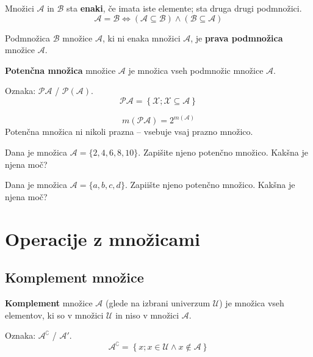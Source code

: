    
            Množici $\mathcal{A}$ in $\mathcal{B}$ sta \textbf{enaki}, če imata iste elemente; 
            sta druga drugi podmnožici.
            $$\mathcal{A}=\mathcal{B}\Leftrightarrow(\mathcal{A}\subseteq\mathcal{B})\land(\mathcal{B}\subseteq\mathcal{A})$$

            Podmnožica $\mathcal{B}$ množice $\mathcal{A}$, ki ni enaka množici $\mathcal{A}$, 
            je \textbf{prava podmnožica} množice $\mathcal{A}$.
            \newline

            \textbf{Potenčna množica} množice $\mathcal{A}$ je množica vseh podmnožic množice $\mathcal{A}$.
            
            Oznaka: $\mathbf{\mathcal{P}\mathcal{A}}$ / $\mathbf{\mathcal{P}(\mathcal{A})}$.
            $$ \mathcal{PA}=\left\{\mathcal{X}; \mathcal{X}\subseteq\mathcal{A} \right\}$$
        

            $$ m(\mathcal{PA})=2^{m(\mathcal{A})}$$
            Potenčna množica ni nikoli prazna -- vsebuje vsaj prazno množico.
    
    
            \begin{naloga}
                Dana je množica $\mathcal{A}=\{2,4,6,8,10\}$. Zapišite njeno potenčno množico. 
                Kakšna je njena moč?
            \end{naloga}

            \begin{naloga}
                Dana je množica $\mathcal{A}=\{a,b,c,d\}$. Zapiište njeno potenčno množico. 
                Kakšna je njena moč?
            \end{naloga}

        \section{Operacije z množicami}

        \subsection{Komplement množice}
        
                    \textbf{Komplement} množice $\mathcal{A}$ (glede na izbrani univerzum $\mathcal{U}$) je množica 
                    vseh elementov, ki so v množici $\mathcal{U}$ in niso v množici $\mathcal{A}$.

                    Oznaka: $\mathbf{\mathcal{A}^\complement}$ / $\mathbf{\mathcal{A}'}$.      
                    $$ \mathcal{A}^\complement=\left\{ x; x\in\mathcal{U}\land x\notin\mathcal{A}\right\} $$           
                

